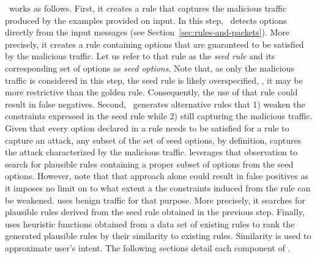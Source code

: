 \documentclass[sigconf,review, anonymous]{acmart}
\begin{document}
\tname\ works as follows. First, it creates a rule that captures the
malicious traffic produced by the examples provided on input. In this
step, \tname\ detects options directly from the input messages (see
Section~\ref{sec:rules-and-packets}). More precisely, it creates a
rule containing options that are guaranteed to be satisfied by the
malicious traffic. Let us refer to that rule as the \emph{seed rule}
and its corresponding set of options as \emph{seed options}. Note
that, as only the malicious traffic is considered in this step, the
seed rule is likely overspecified, \ie{}, it may be more restrictive
than the golden rule. Consequently, the use of that rule could result
in false negatives. Second, \tname\ generates alternative rules that
1) weaken the constraints expressed in the seed rule while 2) still
capturing the malicious traffic. Given that every option declared in a
rule needs to be satisfied for a rule to capture an attack, any subset
of the set of seed options, by definition, captures the attack
characterized by the malicious traffic. \tname{} leverages that
observation to search for plausible rules containing a proper subset
of options from the seed options. However, note that that approach
alone could result in false positives as it imposes no limit on to
what extent a the constraints induced from the rule can be
weakened. \tname{} uses benign traffic for that purpose. More
precisely, it searches for plausible rules derived from the seed rule
obtained in the previous step. Finally, \tname{} uses heuristic
functions obtained from a data set of existing rules to rank the
generated plausible rules by their similarity to existing
rules. Similarity is used to approximate user's intent. The following
sections detail each component of \tname.




\end{document}
